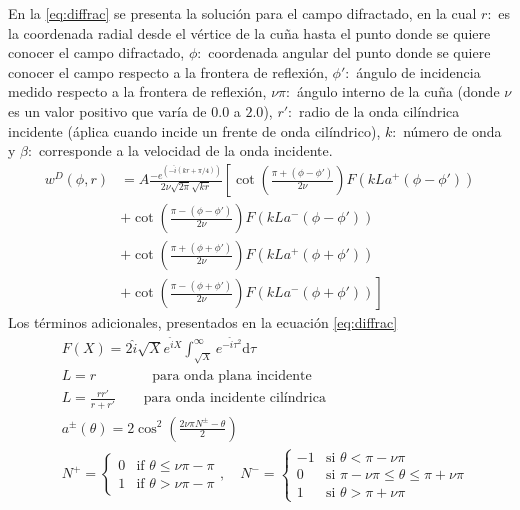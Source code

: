 \documentclass[spanish,letterpaper,12pt,twoside,openany]{article}
\begin{document}
En la \cref{eq:diffrac} se presenta la solución para el campo difractado, en la cual $r:$ es la coordenada radial desde el vértice de la cuña hasta el punto donde se quiere conocer el campo difractado, $\phi:$ coordenada angular del punto donde se quiere conocer el campo respecto a la frontera de reflexión, $\phi':$ ángulo de incidencia medido respecto a la frontera de reflexión, $\nu\pi:$ ángulo interno de la cuña (donde $\nu$ es un valor positivo que varía de $0.0$ a $2.0$), $r':$ radio de la onda cilíndrica incidente (áplica cuando incide un frente de onda cilíndrico), $k:$ número de onda y $\beta:$ corresponde a la velocidad de la onda incidente.
%
\begin{align}
w^{D}\left(\phi,r\right)&=A\frac{-e^{\left(-\hat{i}\left(kr+\pi/4\right)\right)}}{2\nu\sqrt{2\pi}\sqrt{kr}}\left[\cot\left(\frac{\pi+\left(\phi-\phi'\right)}{2\nu}\right)F\left(kLa^{+}\left(\phi-\phi'\right)\right)\right.\nonumber\\
&\left.+\cot\left(\frac{\pi-\left(\phi-\phi'\right)}{2\nu}\right)F\left(kLa^{-}\left(\phi-\phi'\right)\right)\right.\nonumber\\
&\left.+\cot\left(\frac{\pi+\left(\phi+\phi'\right)}{2\nu}\right)F\left(kLa^{+}\left(\phi+\phi'\right)\right)\right.\nonumber\\
&\left.+\cot\left(\frac{\pi-\left(\phi+\phi'\right)}{2\nu}\right)F\left(kLa^{-}\left(\phi+\phi'\right)\right) \right]
\label{eq:diffrac}
\end{align}
%
Los términos adicionales, presentados en la ecuación \ref{eq:diffrac}
\begin{align*}
&F\left(X\right)=2\hat{i}\sqrt{X}e^{\hat{i}X}
\int_{\sqrt{X}}^\infty e^{-\hat{i}\tau^2}\mathrm{d}\tau\\
&L=r\qquad\qquad\text{para onda plana incidente}\\
&L=\frac{rr'}{r+r'}\qquad\text{para onda incidente cilíndrica}\\
&a^{\pm}\left(\theta\right)=2\cos ^{2}\left(\frac{2\nu\pi N^\pm -\theta}{2}\right)\\
&N^+ =
  \begin{cases}
   0 & \text{if } \theta \leq \nu\pi -\pi \\
   1       & \text{if } \theta > \nu\pi -\pi
  \end{cases},\quad N^-=\begin{cases}
  -1 & \text{si } \theta < \pi -\nu\pi \\
   0 & \text{si } \pi -\nu\pi\leq \theta \leq \pi +\nu\pi \\
   1 & \text{si } \theta > \pi +\nu\pi
  \end{cases}
\end{align*}
\end{document}
